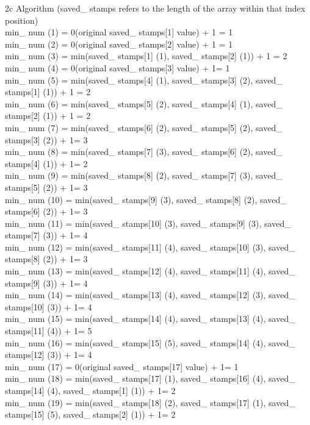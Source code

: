 \documentclass[11pt]{article}
\begin{document}
2c Algorithm (saved\_ stamps refers to the length of the array within that index position)\\
min\_ num (1) = 0(original saved\_ stamps[1] value) + 1 = 1\\
min\_ num (2) = 0(original saved\_ stamps[2] value) + 1 = 1\\
min\_ num (3) = min(saved\_ stamps[1] (1), saved\_ stamps[2] (1)) + 1 = 2\\
min\_ num (4) = 0(original saved\_ stamps[3] value) + 1= 1\\
min\_ num (5) = min(saved\_ stamps[4] (1), saved\_ stamps[3] (2), saved\_ stamps[1] (1)) + 1 = 2\\
min\_ num (6) = min(saved\_ stamps[5] (2), saved\_ stamps[4] (1), saved\_ stamps[2] (1)) + 1 = 2\\
min\_ num (7) = min(saved\_ stamps[6] (2), saved\_ stamps[5] (2), saved\_ stamps[3] (2)) + 1= 3\\
min\_ num (8) = min(saved\_ stamps[7] (3), saved\_ stamps[6] (2), saved\_ stamps[4] (1)) + 1= 2\\
min\_ num (9) = min(saved\_ stamps[8] (2), saved\_ stamps[7] (3), saved\_ stamps[5] (2)) + 1= 3\\
min\_ num (10) = min(saved\_ stamps[9] (3), saved\_ stamps[8] (2), saved\_ stamps[6] (2)) + 1= 3\\
min\_ num (11) = min(saved\_ stamps[10] (3), saved\_ stamps[9] (3), saved\_ stamps[7] (3)) + 1= 4\\
min\_ num (12) = min(saved\_ stamps[11] (4), saved\_ stamps[10] (3), saved\_ stamps[8] (2)) + 1= 3\\
min\_ num (13) = min(saved\_ stamps[12] (4), saved\_ stamps[11] (4), saved\_ stamps[9] (3)) + 1= 4\\
min\_ num (14) = min(saved\_ stamps[13] (4), saved\_ stamps[12] (3), saved\_ stamps[10] (3)) + 1= 4\\
min\_ num (15) = min(saved\_ stamps[14] (4), saved\_ stamps[13] (4), saved\_ stamps[11] (4)) + 1= 5\\
min\_ num (16) = min(saved\_ stamps[15] (5), saved\_ stamps[14] (4), saved\_ stamps[12] (3)) + 1= 4\\
min\_ num (17) = 0(original saved\_ stamps[17] value) + 1= 1\\
min\_ num (18) = min(saved\_ stamps[17] (1), saved\_ stamps[16] (4), saved\_ stamps[14] (4), saved\_ stamps[1] (1)) + 1= 2\\
min\_ num (19) = min(saved\_ stamps[18] (2), saved\_ stamps[17] (1), saved\_ stamps[15] (5), saved\_ stamps[2] (1)) + 1= 2\\
\end{document}
